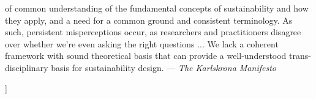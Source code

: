 \documentclass[11pt,twocolumn]{article}
\begin{document}
\begin{@twocolumnfalse}
\begin{lrbox}{\qboxii}
\begin{frquote}
of  common  understanding  of  the  fundamental  concepts  of
sustainability and how they apply, and a need for a common
ground and consistent terminology. As such, persistent 
misperceptions occur, as researchers and practitioners disagree over
whether we're even asking the right questions ...
We  lack  a  coherent  framework  with  sound  theoretical  basis
that can provide a well-understood trans-disciplinary basis for
sustainability design. --- \textit{The Karlskrona Manifesto} {\cite[p. 5]{Karlskrona}}
\end{frquote}
\end{lrbox}	
\vspace{1em}
\begin{flushright}%
\usebox{\qboxii}
\end{flushright}
\vspace{1em}
\decoline{}
\vspace{4em}
\end{@twocolumnfalse}]









%


\end{document}
